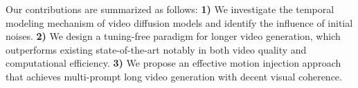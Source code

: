 Our contributions are summarized as follows: \textbf{1)} We investigate the temporal modeling mechanism of video diffusion models and identify the influence of initial noises. \textbf{2)} We design a tuning-free paradigm for longer video generation, which outperforms existing state-of-the-art notably in both video quality and computational efficiency. \textbf{3)} We propose an effective motion injection approach that achieves multi-prompt long video generation with decent visual coherence.

